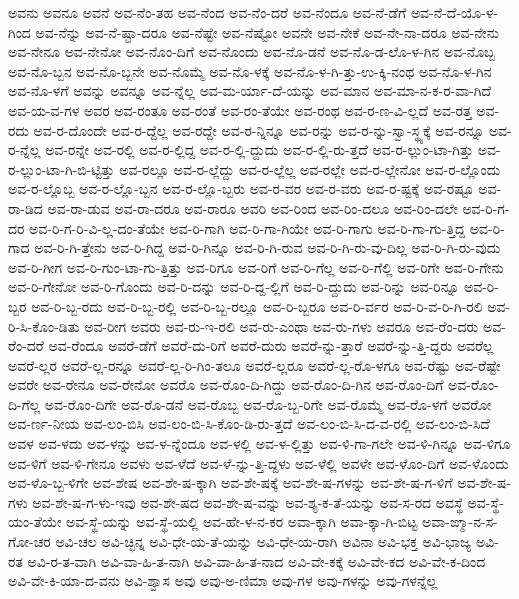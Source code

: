 {ಅವನು
ಅವನೂ
ಅವನೆ
ಅವ-ನೆಂ-ತಹ
ಅವ-ನೆಂದ
ಅವ-ನೆಂ-ದರೆ
ಅವ-ನೆಂದೂ
ಅವ-ನೆ-ಡೆಗೆ
ಅವ-ನೆ-ದೆ-ಯೊ-ಳ-ಗಿಂದ
ಅವ-ನೆನ್ನು
ಅವ-ನೆ-ಷ್ಟಾ-ದರೂ
ಅವ-ನೆಷ್ಟೇ
ಅವ-ನೆಷ್ಟೋ
ಅವನೇ
ಅವ-ನೇಕೆ
ಅವ-ನೇ-ನಾ-ದರೂ
ಅವ-ನೇನು
ಅವ-ನೇನೂ
ಅವ-ನೇನೋ
ಅವ-ನೊಂ-ದಿಗೆ
ಅವ-ನೊಂದು
ಅವ-ನೊ-ಡನೆ
ಅವ-ನೊ-ಡ-ಲೊ-ಳ-ಗಿನ
ಅವ-ನೊಬ್ಬ
ಅವ-ನೊ-ಬ್ಬನ
ಅವ-ನೊ-ಬ್ಬನೇ
ಅವ-ನೊಮ್ಮೆ
ಅವ-ನೊ-ಳಕ್ಕೆ
ಅವ-ನೊ-ಳ-ಗಿ-ತ್ತು-ಉ-ಕ್ಕಿ-ನಂಥ
ಅವ-ನೊ-ಳ-ಗಿನ
ಅವ-ನೊ-ಳಗೆ
ಅವನ್ನು
ಅವನ್ನೂ
ಅವ-ನ್ನೆಲ್ಲ
ಅವ-ಮ-ರ್ಯಾ-ದೆ-ಯನ್ನು
ಅವ-ಮಾನ
ಅವ-ಮಾ-ನ-ಕ-ರ-ವಾ-ಗಿದೆ
ಅವ-ಯ-ವ-ಗಳ
ಅವರ
ಅವ-ರಂತೂ
ಅವ-ರಂತೆ
ಅವ-ರಂ-ತೆಯೇ
ಅವ-ರಂಥ
ಅವ-ರ-ಣ-ವಿ-ಲ್ಲದೆ
ಅವ-ರತ್ತ
ಅವ-ರದು
ಅವ-ರ-ದೊಂದೇ
ಅವ-ರ-ದ್ದೆಲ್ಲ
ಅವ-ರದ್ದೇ
ಅವ-ರ-ನ್ನಿನ್ನೂ
ಅವ-ರನ್ನು
ಅವ-ರ-ನ್ನು-ಸ್ವಾ-ಸ್ಥ್ಯಕ್ಕೆ
ಅವ-ರನ್ನೂ
ಅವ-ರ-ನ್ನೆಲ್ಲ
ಅವ-ರನ್ನೇ
ಅವ-ರಲ್ಲಿ
ಅವ-ರ-ಲ್ಲಿದ್ದ
ಅವ-ರ-ಲ್ಲಿ-ದ್ದುದು
ಅವ-ರ-ಲ್ಲಿ-ರು-ತ್ತದೆ
ಅವ-ರ-ಲ್ಲುಂ-ಟಾ-ಗಿತ್ತು
ಅವ-ರ-ಲ್ಲುಂ-ಟಾ-ಗಿ-ಬಿ-ಟ್ಟಿತ್ತು
ಅವ-ರಲ್ಲೂ
ಅವ-ರ-ಲ್ಲೆದ್ದು
ಅವ-ರ-ಲ್ಲೆಲ್ಲ
ಅವ-ರಲ್ಲೇ
ಅವ-ರ-ಲ್ಲೇನೋ
ಅವ-ರ-ಲ್ಲೊಂದು
ಅವ-ರ-ಲ್ಲೊಬ್ಬ
ಅವ-ರ-ಲ್ಲೊ-ಬ್ಬನ
ಅವ-ರ-ಲ್ಲೊ-ಬ್ಬರು
ಅವ-ರ-ವರ
ಅವ-ರ-ವರು
ಅವ-ರ-ಷ್ಟಕ್ಕೆ
ಅವ-ರಷ್ಟೂ
ಅವ-ರಾ-ಡಿದ
ಅವ-ರಾ-ಡುವ
ಅವ-ರಾ-ದರೂ
ಅವ-ರಾರೂ
ಅವರಿ
ಅವ-ರಿಂದ
ಅವ-ರಿಂ-ದಲೂ
ಅವ-ರಿಂ-ದಲೇ
ಅವ-ರಿ-ಗ-ದರ
ಅವ-ರಿ-ಗ-ರಿ-ವಿ-ಲ್ಲ-ದಂ-ತೆಯೇ
ಅವ-ರಿ-ಗಾಗಿ
ಅವ-ರಿ-ಗಾ-ಗಿಯೇ
ಅವ-ರಿ-ಗಾಗು
ಅವ-ರಿ-ಗಾ-ಗು-ತ್ತಿದ್ದ
ಅವ-ರಿ-ಗಾದ
ಅವ-ರಿ-ಗಿ-ತ್ತೇನು
ಅವ-ರಿ-ಗಿದ್ದ
ಅವ-ರಿ-ಗಿನ್ನೂ
ಅವ-ರಿ-ಗಿ-ರುವ
ಅವ-ರಿ-ಗಿ-ರು-ವು-ದಿಲ್ಲ
ಅವ-ರಿ-ಗಿ-ರು-ವುದು
ಅವ-ರಿ-ಗೀಗ
ಅವ-ರಿ-ಗುಂ-ಟಾ-ಗು-ತ್ತಿತ್ತು
ಅವ-ರಿಗೂ
ಅವ-ರಿಗೆ
ಅವ-ರಿ-ಗೆಲ್ಲ
ಅವ-ರಿ-ಗೆಲ್ಲಿ
ಅವ-ರಿಗೇ
ಅವ-ರಿ-ಗೇನು
ಅವ-ರಿ-ಗೇನೋ
ಅವ-ರಿ-ಗೊಂದು
ಅವ-ರಿ-ದನ್ನು
ಅವ-ರಿ-ದ್ದ-ಲ್ಲಿಗೆ
ಅವ-ರಿ-ದ್ದುದು
ಅವ-ರಿನ್ನು
ಅವ-ರಿನ್ನೂ
ಅವ-ರಿ-ಬ್ಬರ
ಅವ-ರಿ-ಬ್ಬ-ರದು
ಅವ-ರಿ-ಬ್ಬ-ರಲ್ಲಿ
ಅವ-ರಿ-ಬ್ಬ-ರಲ್ಲೂ
ಅವ-ರಿ-ಬ್ಬರೂ
ಅವ-ರಿ-ರ್ವರ
ಅವ-ರಿ-ವ-ರಿ-ಗಿ-ರಲಿ
ಅವ-ರಿ-ಸಿ-ಕೊಂ-ಡಿತು
ಅವ-ರೀಗ
ಅವರು
ಅವ-ರು-ಇ-ರಲಿ
ಅವ-ರು-ಎಂಥಾ
ಅವ-ರು-ಗಳು
ಅವರೂ
ಅವ-ರೆಂ-ದರು
ಅವ-ರೆಂ-ದರೆ
ಅವ-ರೆಂದೂ
ಅವರೆ-ಡೆಗೆ
ಅವರೆ-ದು-ರಿಗೆ
ಅವರೆ-ದುರು
ಅವರೆ-ನ್ನು-ತ್ತಾರೆ
ಅವರೆ-ನ್ನು-ತ್ತಿ-ದ್ದರು
ಅವರೆಲ್ಲ
ಅವರೆ-ಲ್ಲರ
ಅವರೆ-ಲ್ಲ-ರನ್ನೂ
ಅವರೆ-ಲ್ಲ-ರಿ-ಗಿಂ-ತಲೂ
ಅವರೆ-ಲ್ಲರೂ
ಅವರೆ-ಲ್ಲ-ರೊ-ಳಗೂ
ಅವ-ರೆಷ್ಟು
ಅವ-ರೆಷ್ಟೇ
ಅವರೇ
ಅವ-ರೇನೂ
ಅವ-ರೇನೋ
ಅವರೊ
ಅವ-ರೊಂ-ದಿ-ಗಿದ್ದು
ಅವ-ರೊಂ-ದಿ-ಗಿನ
ಅವ-ರೊಂ-ದಿಗೆ
ಅವ-ರೊಂ-ದಿ-ಗೆಲ್ಲ
ಅವ-ರೊಂ-ದಿಗೇ
ಅವ-ರೊ-ಡನೆ
ಅವ-ರೊಬ್ಬ
ಅವ-ರೊ-ಬ್ಬ-ರಿಗೇ
ಅವ-ರೊಮ್ಮೆ
ಅವ-ರೊ-ಳಗೆ
ಅವರೋ
ಅವ-ರ್ಣ-ನೀಯ
ಅವ-ಲಂ-ಬಿಸಿ
ಅವ-ಲಂ-ಬಿ-ಸಿ-ಕೊಂ-ಡಿ-ರು-ತ್ತದೆ
ಅವ-ಲಂ-ಬಿ-ಸಿ-ದ-ವ-ರಲ್ಲಿ
ಅವ-ಲಂ-ಬಿ-ಸಿದೆ
ಅವಳ
ಅವ-ಳದು
ಅವ-ಳನ್ನು
ಅವ-ಳ-ನ್ನೆಂದೂ
ಅವ-ಳಲ್ಲಿ
ಅವ-ಳ-ಲ್ಲಿತ್ತು
ಅವ-ಳಿ-ಗಾ-ಗಲೇ
ಅವ-ಳಿ-ಗಿನ್ನೂ
ಅವ-ಳಿಗೂ
ಅವ-ಳಿಗೆ
ಅವ-ಳಿ-ಗೇನೂ
ಅವಳು
ಅವ-ಳೆದೆ
ಅವ-ಳೆ-ನ್ನು-ತ್ತಿ-ದ್ದಳು
ಅವ-ಳೆಲ್ಲಿ
ಅವಳೇ
ಅವ-ಳೊಂ-ದಿಗೆ
ಅವ-ಳೊಂದು
ಅವ-ಳೊ-ಬ್ಬ-ಳಿಗೇ
ಅವ-ಶೇಷ
ಅವ-ಶೇ-ಷ-ಕ್ಕಾಗಿ
ಅವ-ಶೇ-ಷಕ್ಕೆ
ಅವ-ಶೇ-ಷ-ಗಳನ್ನು
ಅವ-ಶೇ-ಷ-ಗ-ಳಿಗೆ
ಅವ-ಶೇ-ಷ-ಗಳು
ಅವ-ಶೇ-ಷ-ಗ-ಳು-ಇವು
ಅವ-ಶೇ-ಷದ
ಅವ-ಶೇ-ಷ-ವನ್ನು
ಅವ-ಶ್ಯ-ಕ-ತೆ-ಯನ್ನು
ಅವ-ಸ-ರದ
ಅವಸ್ಥೆ
ಅವ-ಸ್ಥೆ-ಯಂ-ತೆಯೇ
ಅವ-ಸ್ಥೆ-ಯನ್ನು
ಅವ-ಸ್ಥೆ-ಯಲ್ಲಿ
ಅವ-ಹೇ-ಳ-ನ-ಕರ
ಅವಾ-ಕ್ಕಾಗಿ
ಅವಾ-ಕ್ಕಾ-ಗಿ-ಬಿಟ್ಟ
ಅವಾ-ಙ್ಮಾ-ನ-ಸ-ಗೋ-ಚರ
ಅವಿ-ಚಲ
ಅವಿ-ಚ್ಛಿನ್ನ
ಅವಿ-ಧೇ-ಯ-ತೆ-ಯನ್ನು
ಅವಿ-ಧೇ-ಯ-ರಾಗಿ
ಅವಿನಾ
ಅವಿ-ಭಕ್ತ
ಅವಿ-ಭಾಜ್ಯ
ಅವಿ-ರತ
ಅವಿ-ರ-ತ-ವಾಗಿ
ಅವಿ-ವಾ-ಹಿ-ತ-ನಾಗಿ
ಅವಿ-ವಾ-ಹಿ-ತ-ನಾದ
ಅವಿ-ವೇ-ಕಕ್ಕೆ
ಅವಿ-ವೇ-ಕದ
ಅವಿ-ವೇ-ಕ-ದಿಂದ
ಅವಿ-ವೇ-ಕಿ-ಯಾ-ದ-ವನು
ಅವಿ-ಶ್ವಾಸ
ಅವು
ಅವು-ಅ-ಣಿಮಾ
ಅವು-ಗಳ
ಅವು-ಗಳನ್ನು
ಅವು-ಗಳನ್ನೆಲ್ಲ
}
